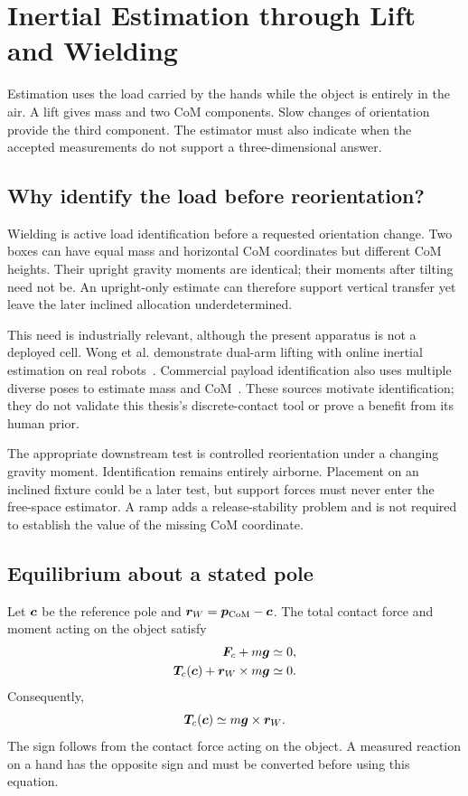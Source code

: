 \chapter{Inertial Estimation through Lift and Wielding}
\label{ch:estimation}

Estimation uses the load carried by the hands while the object is entirely in the air. A lift gives mass and two CoM components. Slow changes of orientation provide the third component. The estimator must also indicate when the accepted measurements do not support a three-dimensional answer.

\section{Why identify the load before reorientation?}

Wielding is active load identification before a requested orientation change. Two boxes can have equal mass and horizontal CoM coordinates but different CoM heights. Their upright gravity moments are identical; their moments after tilting need not be. An upright-only estimate can therefore support vertical transfer yet leave the later inclined allocation underdetermined.

This need is industrially relevant, although the present apparatus is not a deployed cell. Wong et al. demonstrate dual-arm lifting with online inertial estimation on real robots~\cite{wong2026}. Commercial payload identification also uses multiple diverse poses to estimate mass and CoM~\cite{urpayload}. These sources motivate identification; they do not validate this thesis's discrete-contact tool or prove a benefit from its human prior.

The appropriate downstream test is controlled reorientation under a changing gravity moment. Identification remains entirely airborne. Placement on an inclined fixture could be a later test, but support forces must never enter the free-space estimator. A ramp adds a release-stability problem and is not required to establish the value of the missing CoM coordinate.

\section{Equilibrium about a stated pole}

Let $\bm{c}$ be the reference pole and $\bm{r}_W=\bm{p}_{\mathrm{CoM}}-\bm{c}$. The total contact force and moment acting on the object satisfy
\begin{align}
\bm{F}_c+m\bm{g}&\simeq0,\\
\bm{T}_c(\bm{c})+\bm{r}_W\times m\bm{g}&\simeq0.
\end{align}
Consequently,
\begin{equation}
\bm{T}_c(\bm{c})\simeq m\bm{g}\times\bm{r}_W.
\label{eq:estimation-moment}
\end{equation}
The sign follows from the contact force acting on the object. A measured reaction on a hand has the opposite sign and must be converted before using this equation.

